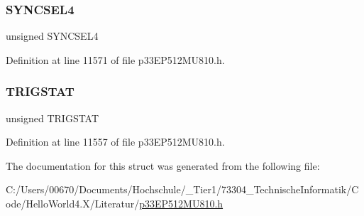 \subsubsection{\texorpdfstring{S\+Y\+N\+C\+S\+E\+L4}{SYNCSEL4}}
{\footnotesize\ttfamily unsigned S\+Y\+N\+C\+S\+E\+L4}



Definition at line 11571 of file p33\+E\+P512\+M\+U810.\+h.

\mbox{\label{structtag_o_c7_c_o_n2_b_i_t_s_ab379549de54ac93ad4aa73686c34cb7c}} 
\subsubsection{\texorpdfstring{T\+R\+I\+G\+S\+T\+AT}{TRIGSTAT}}
{\footnotesize\ttfamily unsigned T\+R\+I\+G\+S\+T\+AT}



Definition at line 11557 of file p33\+E\+P512\+M\+U810.\+h.



The documentation for this struct was generated from the following file\+:\begin{DoxyCompactItemize}
\item 
C\+:/\+Users/00670/\+Documents/\+Hochschule/\+\_\+\+Tier1/73304\+\_\+\+Technische\+Informatik/\+Code/\+Hello\+World4.\+X/\+Literatur/\hyperlink{p33_e_p512_m_u810_8h}{p33\+E\+P512\+M\+U810.\+h}\end{DoxyCompactItemize}
